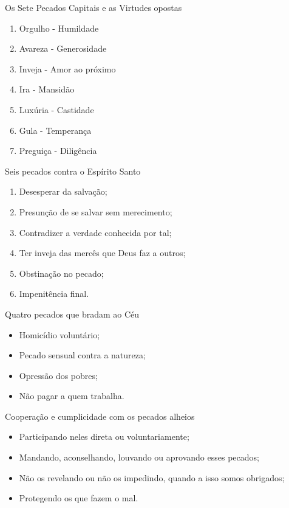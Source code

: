 \documentclass{book}
\begin{document}
\begin{center}
    Os Sete Pecados Capitais e as Virtudes opostas
\end{center}
\begin{enumerate}
    \item Orgulho - Humildade
    \item Avareza - Generosidade
    \item Inveja - Amor ao próximo
    \item Ira - Mansidão
    \item Luxúria - Castidade
    \item Gula - Temperança
    \item Preguiça - Diligência
\end{enumerate}
\begin{center}
    Seis pecados contra o Espírito Santo
\end{center}
\begin{enumerate}
    \item Desesperar da salvação;
    \item Presunção de se salvar sem merecimento;
    \item Contradizer a verdade conhecida por tal;
    \item Ter inveja das mercês que Deus faz a outros;
    \item Obstinação no pecado;
    \item Impenitência final.
\end{enumerate}
\newpage
\begin{center}
    Quatro pecados que bradam ao Céu
\end{center}
\begin{itemize}
    \item Homicídio voluntário;
    \item Pecado sensual contra a natureza;
    \item Opressão dos pobres;
    \item Não pagar a quem trabalha.
\end{itemize}
\begin{center}
    Cooperação e cumplicidade com os pecados alheios
\end{center}
\begin{itemize}
    \item Participando neles direta ou voluntariamente;
    \item Mandando, aconselhando, louvando ou aprovando esses pecados;
    \item Não os revelando ou não os impedindo, quando a isso somos obrigados;
    \item Protegendo os que fazem o mal.
\end{itemize}
\end{document}
